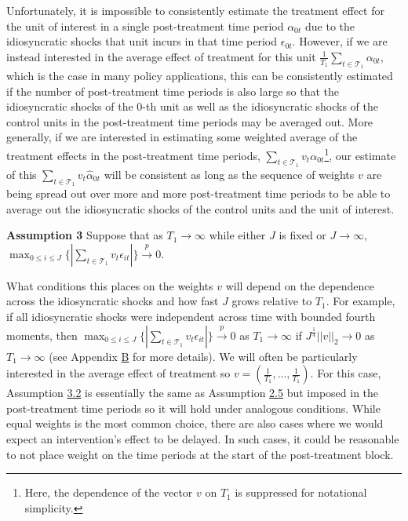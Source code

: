 \documentclass{article}
\begin{document}
Unfortunately, it is impossible to consistently estimate the treatment effect for the unit of interest in a single post-treatment time period $\alpha_{0t}$ due to the idiosyncratic shocks that unit incurs in that time period $\epsilon_{0t}$. However, if we are instead interested in the average effect of treatment for this unit $\frac{1}{T_1} \sum_{t \in \mathcal{T}_1}  \alpha_{0t}$, which is the case in many policy applications, this can be consistently estimated if the number of post-treatment time periods is also large so that the idiosyncratic shocks of the $0$-th unit as well as the idiosyncratic shocks of the control units in the post-treatment time periods may be averaged out. More generally, if we are interested in estimating some weighted average of the treatment effects in the post-treatment time periods, $\sum_{t \in \mathcal{T}_1} v_t \alpha_{0t}$\footnote{Here, the dependence of the vector $v$ on $T_1$ is suppressed for notational simplicity.}, our estimate of this $\sum_{t \in \mathcal{T}_1} v_t \hat{\alpha}_{0t}$ will be consistent as long as the sequence of weights $v$ are being spread out over more and more post-treatment time periods to be able to average out the idiosyncratic shocks of the control units and the unit of interest.

\textbf{Assumption 3} \label{A3}
Suppose that as $T_1 \rightarrow \infty$ while either $J$ is fixed or $J \rightarrow \infty$, $\max_{0 \leq i \leq J} \{| \sum_{t \in \mathcal{T}_1} v_t \epsilon_{it} | \} \overset{p}{\rightarrow} 0$.
\par
What conditions this places on the weights $v$ will depend on the dependence across the idiosyncratic shocks and how fast $J$ grows relative to $T_1$. For example, if all idiosyncratic shocks were independent across time with bounded fourth moments, then 
$\max_{0 \leq i \leq J} \{| \sum_{t \in \mathcal{T}_1} v_t \epsilon_{it} | \} \overset{p}{\rightarrow} 0$ as $T_1 \rightarrow \infty$ if $J^{\frac{1}{4}} ||v||_2 \rightarrow 0$ as $T_1 \rightarrow \infty$ (see Appendix \hyperref[ApB]{B} for more details). 
We will often be particularly interested in the average effect of treatment so $v = (\frac{1}{T_1},...,\frac{1}{T_1})$. For this case, Assumption \hyperref[A3]{3.2} is essentially the same as Assumption \hyperref[A2]{2.5} but imposed in the post-treatment time periods so it will hold under analogous conditions. While equal weights is the most common choice, there are also cases where we would expect an intervention's effect to be delayed. In such cases, it could be reasonable to not place weight on the time periods at the start of the post-treatment block.  
\end{document}
